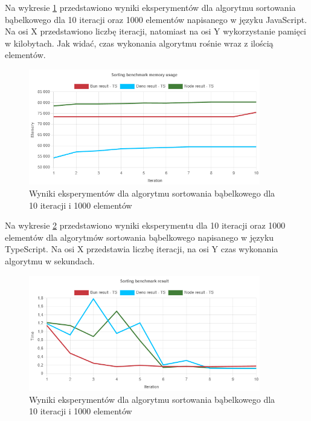 Na wykresie \ref{fig:radix_sorting_e1_memory_js} przedstawiono wyniki eksperymentów dla algorytmu sortowania bąbelkowego dla 10 iteracji oraz 1000 elementów napisanego w języku JavaScript. Na osi X przedstawiono liczbę iteracji, natomiast na osi Y wykorzystanie pamięci w kilobytach. Jak widać, czas wykonania algorytmu rośnie wraz z ilością elementów.
\begin{figure}[H]
  \centering
  \includegraphics[width=0.9\textwidth]{Figures/sorting/radix/e1_memory_ts.png}
  \caption{Wyniki eksperymentów dla algorytmu sortowania bąbelkowego dla 10 iteracji i 1000 elementów}
  \label{fig:radix_sorting_e1_memory_js}
\end{figure}

Na wykresie \ref{fig:radix_sorting_e1_ts} przedstawiono wyniki eksperymentu dla 10 iteracji oraz 1000 elementów dla algorytmów sortowania bąbelkowego napisanego w języku TypeScript. Na osi X przedstawia liczbę iteracji, na osi Y czas wykonania algorytmu w sekundach.

\begin{figure}[H]
  \centering
  \includegraphics[width=0.9\textwidth]{Figures/sorting/radix/e1_ts.png}
  \caption{Wyniki eksperymentów dla algorytmu sortowania bąbelkowego dla 10 iteracji i 1000 elementów}
  \label{fig:radix_sorting_e1_ts}
\end{figure}

